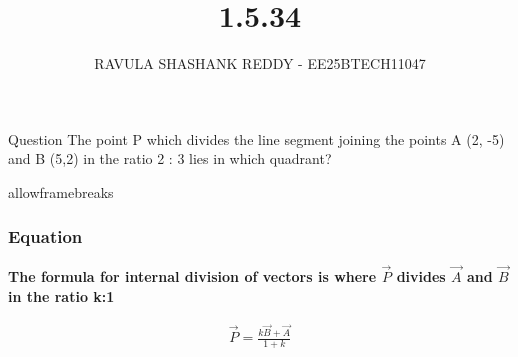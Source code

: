 \documentclass{beamer}
\title %
{1.5.34}
\author %
{RAVULA SHASHANK REDDY - EE25BTECH11047}
\begin{document}
	
	
	\frame{\titlepage}
	\begin{frame}{Question}
		The point P which divides the line segment joining the points A (2, -5)
		and B (5,2) in the ratio 2 : 3 lies in which quadrant?
	\end{frame}
	\begin{frame}{allowframebreaks}
		\frametitle{Equation}
	\textbf{The formula for internal division of vectors is where $\vec{P}$ divides $\vec{A}$ and $\vec{B}$ in the ratio k:1}
		\centering
		
		\label{tab:parameters}
		\begin{align*}
			\vec{P} =	\frac{k\vec{B} + \vec{A}}{1+k} 
		\end{align*}
		\end{frame}	
	
\end{document}

